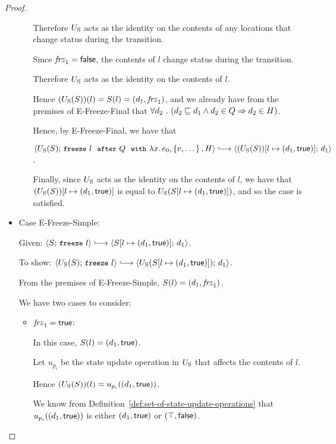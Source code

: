 \begin{proof}
\begin{itemize}
\begin{itemize}
      Therefore $U_{\mathrm{S}}$ acts as the identity on the contents of any
      locations that change status during the transition.

      Since $\mathit{frz}_1 = \textsf{false}$, the contents of $l$ change
      status during the transition.

      Therefore $U_{\mathrm{S}}$ acts as the identity on the contents of $l$.

      Hence $(U_{\mathrm{S}}(S))(l) = S(l) = (d_1, \mathit{frz}_1)$, and we
      already have from the premises of {\sc E-Freeze-Final} that
      $\forall{d_2} ~.~ ( {d_2 \sqsubseteq d_1 \land d_2 \in Q}
      \Rightarrow d_2 \in H)$.

      Hence, by {\sc E-Freeze-Final}, we have that

      $\config{\Ustore(S)}{\freezeafterfull{l}{Q}{\lam{x}{e_0}}{\setof{v,
            \dots}}{H}} \parstepsto
      \config{\extS{(\Ustore(S))}{l}{d_1}{\frozentrue}}{d_1}$.

      Finally, since $U_{\mathrm{S}}$ acts as the identity on the contents of
      $l$, we have that $(U_{\mathrm{S}}(S))[l \mapsto (d_1, \textsf{true})]$ is
      equal to $U_{\mathrm{S}}(S[l \mapsto (d_1, \textsf{true})])$, and so the case
      is satisfied.
    \end{itemize}

  \item Case {\sc E-Freeze-Simple}:

    Given: $\config{S}{\freeze{l}} \parstepsto
    \config{\extS{S}{l}{d_1}{\frozentrue}}{d_1}$.

    To show: $\config{\Ustore(S)}{\freeze{l}} \parstepsto
    \config{\Ustore(\extS{S}{l}{d_1}{\frozentrue})}{d_1}$.

    From the premises of {\sc E-Freeze-Simple}, $S(l) =
    (d_1, \mathit{frz}_1)$.

    We have two cases to consider:
    \begin{itemize}
    \item $\mathit{frz}_1 = \textsf{true}$:

      In this case, $S(l) = (d_1, \textsf{true})$.

      Let $u_{p_i}$ be the state update operation in $U_{\mathrm{S}}$ that
      affects the contents of $l$.

      Hence $(U_{\mathrm{S}}(S))(l) = u_{p_i}((d_1, \textsf{true}))$.

      We know from Definition~\ref{def:set-of-state-update-operations}
      that $u_{p_i}((d_1, \textsf{true}))$ is either
      $(d_1, \textsf{true})$ or $(\top, \textsf{false})$.


\end{itemize}
\end{itemize}
\end{proof}
